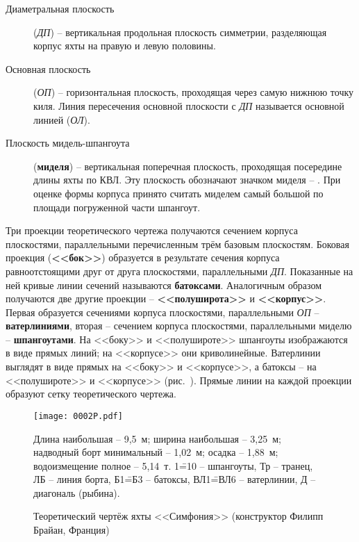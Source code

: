 \begin{description}
\item [Диаметральная плоскость]
  (\textit{ДП}) \--- вертикальная продольная плоскость симметрии,
  разделяющая корпус яхты на правую и левую половины.
\item [Основная плоскость] (\textit{ОП})
  \--- горизонтальная плоскость, проходящая через самую нижнюю точку
  киля. Линия пересечения основной плоскости с \textit{ДП} называется
  основной линией (\textit{ОЛ}).
\item [Плоскость мидель-шпангоута]
  (\textbf{миделя}) \--- вертикальная поперечная
  плоскость, проходящая посередине длины яхты по КВЛ. Эту плоскость
  обозначают значком миделя \--- \midelsign. При оценке формы корпуса
  принято считать миделем самый большой по площади погруженной части
  шпангоут.
\end{description}

Три проекции теоретического чертежа получаются сечением корпуса
плоскостями, параллельными перечисленным трём базовым
плоскостям. Боковая проекция (\textbf{<<бок>>}) образуется в
результате сечения корпуса равноотстоящими друг от друга плоскостями,
параллельными \textit{ДП}. Показанные на ней кривые линии сечений
называются \textbf{батоксами}. Аналогичным образом получаются две
другие проекции \--- \textbf{<<полуширота>>} и
\textbf{<<корпус>>}. Первая образуется сечениями корпуса плоскостями,
параллельными \textit{ОП} \--- \textbf{ватерлиниями}, вторая \---
сечением корпуса плоскостями, параллельными миделю \---
\textbf{шпангоутами}. На <<боку>> и <<полушироте>> шпангоуты
изображаются в виде прямых линий; на <<корпусе>> они
криволинейные. Ватерлинии выглядят в виде прямых на <<боку>> и
<<корпусе>>, а батоксы \--- на <<полушироте>> и <<корпусе>>
(рис.~). Прямые линии на каждой проекции образуют сетку
теоретического чертежа.

\begin{figure*}[htb]
   \centering
   \texttt{[image: 0002P.pdf]}
   \caption{Теоретический чертёж яхты <<Симфония>> (конструктор Филипп Брайан, Франция)}
   \label{fig:2}
   \centering{}
   \small  
   Длина наибольшая \--- 9,5~м;
   ширина наибольшая \--- 3,25~м;
   надводный борт минимальный \--- 1,02~м;
   осадка \--- 1,88~м;
   водоизмещение полное \--- 5,14~т.
   1\==10 \--- шпангоуты,
   Тр \--- транец,
   ЛБ \--- линия борта,
   Б1\==Б3 \--- батоксы,
   ВЛ1\==ВЛ6 \--- ватерлинии,
   Д \--- диагональ (рыбина).
\end{figure*}


